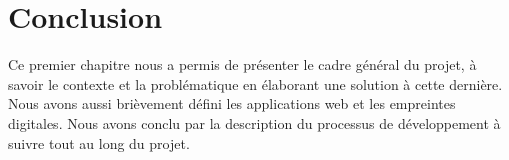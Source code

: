 \vspace{-30pt}
\section{Conclusion}
Ce premier chapitre nous a permis de présenter le cadre général du projet, à
savoir le contexte et la problématique en élaborant une solution à cette
dernière. Nous avons aussi brièvement défini les applications web et les
empreintes digitales. Nous avons conclu par la description du processus de
développement à suivre tout au long du projet.
